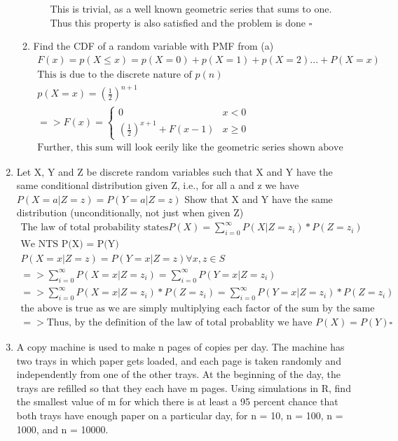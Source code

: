 \documentclass[11pt]{article}
\begin{document}
\begin{enumerate}
\begin{enumerate}
\begin{enumerate}
		This is trivial, as a well known geometric series that sums to one. Thus this property is also satisfied and the problem is done $\square$	
	\end{enumerate}
	\item Find the CDF of a random variable with PMF from (a)
	\begin{gather}
		F(x) = p(X\leq x) = p(X=0) + p(X=1) + p(X=2) ... + P(X=x) \\
		\text{This is due to the discrete nature of $p(n)$} \\
		p(X=x) = (\frac{1}{2})^{n+1}\\
		=> F(x) = 
		\begin{cases}
			0 & x<0 \\
			(\frac{1}{2})^{x+1} + F(x-1) & x \geq 0
		\end{cases}
		\\
		\text{Further, this sum will look eerily like the geometric series shown above} 		
	\end{gather}
\end{enumerate}
\item Let X, Y and Z be discrete random variables such that X and Y have the same conditional distribution given
Z, i.e., for all a and z we have
$P(X = a | Z = z) = P(Y = a | Z = z)$
Show that X and Y have the same distribution (unconditionally, not just when given Z)
\begin{gather}
	\text{The law of total probability states} P(X) = \sum_{i=0}^{\infty}P(X|Z=z_i) * P(Z=z_i)\\
	\text{We NTS P(X) = P(Y)}\\
	P(X=x|Z=z) = P(Y=x|Z=z) \forall x,z \in S \\
	=> \sum_{i=0}^{\infty} P(X=x|Z=z_i) = \sum_{i=0}^{\infty} P(Y=x|Z=z_i) \\
	=>\sum_{i=0}^{\infty} P(X=x|Z=z_i)*P(Z=z_i) = \sum_{i=0}^{\infty} P(Y=x|Z=z_i)*P(Z=z_i) \\
	\text{the above is true as we are simply multiplying each factor of the sum by the same value on both sides}\\
	=> \text{Thus, by the definition of the law of total probablity we have }  P(X) = P(Y) \square
\end{gather}

\item A copy machine is used to make n pages of copies per day. The machine has two trays in which paper gets
loaded, and each page is taken randomly and independently from one of the other trays. At the beginning
of the day, the trays are refilled so that they each have m pages. Using simulations in R, find the smallest
value of m for which there is at least a 95 percent chance that both trays have enough paper on a particular day,
for n = 10, n = 100, n = 1000, and n = 10000.
\begin{verbatim}


\end{verbatim}
\end{enumerate}
\end{document}
